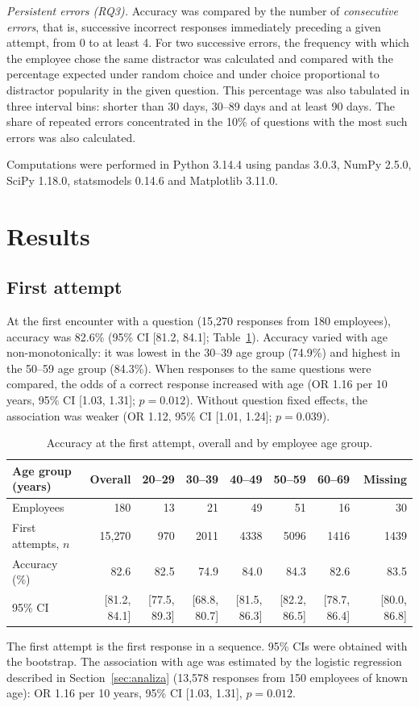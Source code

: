 \documentclass[preprint,12pt,authoryear]{elsarticle}
\newcommand{\uwagatabeli}[1]{\par\vspace{2pt}\parbox{\linewidth}{\footnotesize #1}}
\begin{document}
\emph{Persistent errors (RQ3).} Accuracy was compared by the number of \emph{consecutive errors}, that
is, successive incorrect responses immediately preceding a given attempt, from 0 to at least 4.
For two successive errors, the frequency with which the employee chose the same distractor was
calculated and compared with the percentage expected under random choice and under choice
proportional to distractor popularity in the given question. This percentage was also tabulated in
three interval bins: shorter than 30 days, 30--89 days and at least 90 days. The share of repeated
errors concentrated in the 10\% of questions with the most such errors was also calculated.

Computations were performed in Python 3.14.4 using pandas 3.0.3, NumPy 2.5.0, SciPy
1.18.0, statsmodels 0.14.6 and Matplotlib 3.11.0.
\section{Results}

\subsection{First attempt}
At the first encounter with a question (15{,}270 responses from 180 employees), accuracy
was 82.6\% (95\% CI [81.2, 84.1]; Table~\ref{tab:pierwsza_proba_wiek}). Accuracy varied with age
non-monotonically: it was lowest in the 30--39 age group (74.9\%) and highest in
the 50--59 age group (84.3\%). When responses to the same questions were
compared, the odds of a correct response increased with age (OR 1.16 per 10 years, 95\% CI
[1.03, 1.31]; $p = 0.012$). Without question fixed effects, the association was weaker
(OR 1.12, 95\% CI [1.01, 1.24]; $p = 0.039$).

\begin{table}[H]
\centering
\caption{Accuracy at the first attempt, overall and by employee age group.}
\label{tab:pierwsza_proba_wiek}
\footnotesize
\setlength{\tabcolsep}{4pt}
\begin{tabular}{l*{7}{r}}
\toprule
Age group (years) & Overall & 20--29 & 30--39 & 40--49 & 50--59 & 60--69 & Missing \\
\midrule
Employees & 180 & 13 & 21 & 49 & 51 & 16 & 30 \\
First attempts, $n$ & 15{,}270 & 970 & 2011 & 4338 & 5096 & 1416 & 1439 \\
Accuracy (\%) & 82.6 & 82.5 & 74.9 & 84.0 & 84.3 & 82.6 & 83.5 \\
95\% CI & [81.2, 84.1] & [77.5, 89.3] & [68.8, 80.7] & [81.5, 86.3] & [82.2, 86.5] & [78.7, 86.4] & [80.0, 86.8] \\
\bottomrule
\end{tabular}%
\uwagatabeli{The first attempt is the first response in a sequence. 95\% CIs were obtained with the
bootstrap. The association with age was estimated by the logistic regression described in
Section~\ref{sec:analiza} (13{,}578 responses from 150 employees of known age):
OR 1.16 per 10 years, 95\% CI [1.03, 1.31], $p = 0.012$.}
\end{table}
\end{document}
